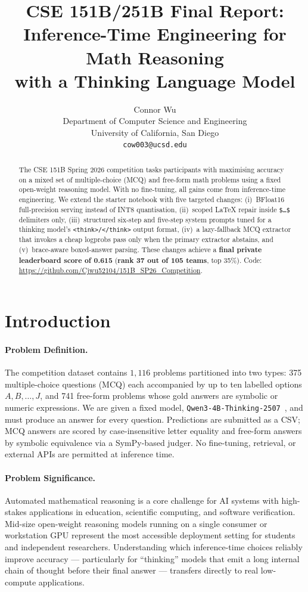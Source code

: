 \documentclass{article}
\title{
CSE 151B/251B Final Report:\\
Inference-Time Engineering for Math Reasoning\\
with a Thinking Language Model
}
\author{%
  Connor Wu \\
  Department of Computer Science and Engineering\\
  University of California, San Diego\\
  \texttt{cow003@ucsd.edu} \\
}
\begin{document}
\maketitle


\begin{abstract}
The CSE 151B Spring 2026 competition tasks participants with maximising
accuracy on a mixed set of multiple-choice (MCQ) and free-form math problems
using a fixed open-weight reasoning model.
With no fine-tuning, all gains come from inference-time engineering.
We extend the starter notebook with five targeted changes:
(i)~BFloat16 full-precision serving instead of INT8 quantisation,
(ii)~scoped LaTeX repair inside \texttt{\$\ldots\$} delimiters only,
(iii)~structured six-step and five-step system prompts tuned for a thinking
model's \texttt{<think>/</think>} output format,
(iv)~a lazy-fallback MCQ extractor that invokes a cheap logprobs pass only
when the primary extractor abstains, and
(v)~brace-aware boxed-answer parsing.
These changes achieve a \textbf{final private leaderboard score of 0.615}
(\textbf{rank 37 out of 105 teams}, top 35\%).
Code: \url{https://github.com/Cjwu52104/151B_SP26_Competition}.
\end{abstract}


\section{Introduction}
\label{sec:intro}

\paragraph{Problem Definition.}
The competition dataset contains $1{,}116$ problems partitioned into two
types: 375 multiple-choice questions (MCQ) each accompanied by up to ten
labelled options $A,B,\dots,J$, and 741 free-form problems whose gold answers
are symbolic or numeric expressions.
We are given a fixed model,
\texttt{Qwen3-4B-Thinking-2507}~\citep{qwen3}, and must produce an answer
for every question.
Predictions are submitted as a CSV; MCQ answers are scored by case-insensitive
letter equality and free-form answers by symbolic equivalence via a SymPy-based
judger.
No fine-tuning, retrieval, or external APIs are permitted at inference time.

\paragraph{Problem Significance.}
Automated mathematical reasoning is a core challenge for AI systems with
high-stakes applications in education, scientific computing, and software
verification.
Mid-size open-weight reasoning models running on a single consumer or
workstation GPU represent the most accessible deployment setting for students
and independent researchers.
Understanding which inference-time choices reliably improve accuracy —
particularly for ``thinking'' models that emit a long internal chain of thought
before their final answer — transfers directly to real low-compute
applications.
\end{document}

